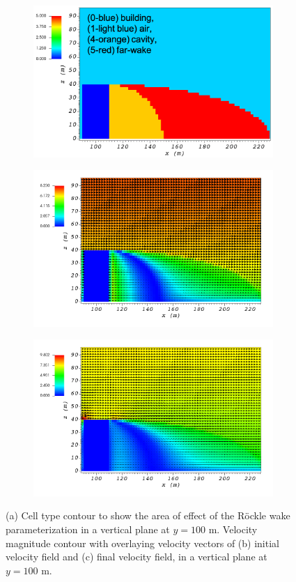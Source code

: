 \begin{figure}[H]
    \centering
    \begin{subfigure}{\textwidth}
    \centering
    \includegraphics[width=10.3cm,keepaspectratio]{Images/wake_y_100_1_init_icell.png}
    \caption{}
    \end{subfigure}
    \begin{subfigure}{\textwidth}
    \centering
    \includegraphics[width=11.0cm,keepaspectratio]{Images/wake_y_100_1_init_vel.png}
    \caption{}
    \end{subfigure}
    \begin{subfigure}{\textwidth}
    \centering
    \includegraphics[width=11.0cm,keepaspectratio]{Images/wake_y_100_1_final.png}
    \caption{}
    \end{subfigure}
    \caption{(a) Cell type contour to show the area of effect of the R\"{o}ckle wake parameterization in a vertical plane at $y=100$ m. Velocity magnitude contour with overlaying velocity vectors of (b) initial velocity field and (c) final velocity field, in a vertical plane at $y=100$ m.}
\end{figure}

